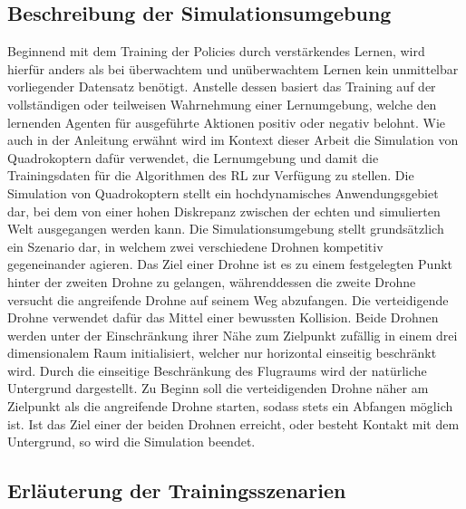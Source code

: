 \subsection{Beschreibung der Simulationsumgebung}

Beginnend mit dem Training der Policies durch verstärkendes Lernen, wird hierfür anders als bei überwachtem und unüberwachtem Lernen kein unmittelbar vorliegender Datensatz benötigt.
Anstelle dessen basiert das Training auf der vollständigen oder teilweisen Wahrnehmung einer Lernumgebung, welche den lernenden Agenten für ausgeführte Aktionen positiv oder negativ belohnt.
Wie auch in der Anleitung erwähnt wird im Kontext dieser Arbeit die Simulation von Quadrokoptern dafür verwendet, die Lernumgebung und damit die Trainingsdaten für die Algorithmen des RL zur Verfügung zu stellen.
Die Simulation von Quadrokoptern stellt ein hochdynamisches Anwendungsgebiet dar, bei dem von einer hohen Diskrepanz zwischen der echten und simulierten Welt ausgegangen werden kann. 
Die Simulationsumgebung stellt grundsätzlich ein Szenario dar, in welchem zwei verschiedene Drohnen kompetitiv gegeneinander agieren.
Das Ziel einer Drohne ist es zu einem festgelegten Punkt hinter der zweiten Drohne zu gelangen, währenddessen die zweite Drohne versucht die angreifende Drohne auf seinem Weg abzufangen. 
Die verteidigende Drohne verwendet dafür das Mittel einer bewussten Kollision.
Beide Drohnen werden unter der Einschränkung ihrer Nähe zum Zielpunkt zufällig in einem drei dimensionalem Raum initialisiert, welcher nur horizontal einseitig beschränkt wird.
Durch die einseitige Beschränkung des Flugraums wird der natürliche Untergrund dargestellt.
Zu Beginn soll die verteidigenden Drohne näher am Zielpunkt als die angreifende Drohne starten, sodass stets ein Abfangen möglich ist.
Ist das Ziel einer der beiden Drohnen erreicht, oder besteht Kontakt mit dem Untergrund, so wird die Simulation beendet.

\subsection{Erläuterung der Trainingsszenarien}

